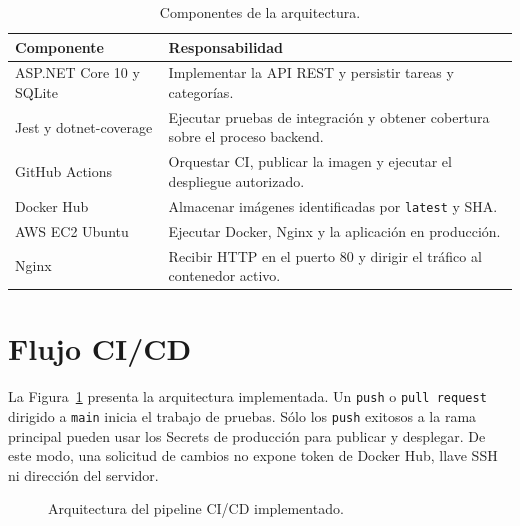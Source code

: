 \documentclass[12pt,a4paper]{report}
\begin{document}
\begin{table}[H]
\centering
\caption{Componentes de la arquitectura.}
\label{tab:components}
\begin{tabularx}{\textwidth}{>{\raggedright\arraybackslash}p{3.2cm}X}
\toprule
\textbf{Componente} & \textbf{Responsabilidad} \\
\midrule
ASP.NET Core 10 y SQLite & Implementar la API REST y persistir tareas y categorías. \\
Jest y dotnet-coverage & Ejecutar pruebas de integración y obtener cobertura sobre el proceso backend. \\
GitHub Actions & Orquestar CI, publicar la imagen y ejecutar el despliegue autorizado. \\
Docker Hub & Almacenar imágenes identificadas por \texttt{latest} y SHA. \\
AWS EC2 Ubuntu & Ejecutar Docker, Nginx y la aplicación en producción. \\
Nginx & Recibir HTTP en el puerto 80 y dirigir el tráfico al contenedor activo. \\
\bottomrule
\end{tabularx}
\end{table}

\section{Flujo CI/CD}

La Figura~\ref{fig:architecture} presenta la arquitectura implementada. Un \texttt{push} o \texttt{pull request} dirigido a \texttt{main} inicia el trabajo de pruebas. Sólo los \texttt{push} exitosos a la rama principal pueden usar los Secrets de producción para publicar y desplegar. De este modo, una solicitud de cambios no expone token de Docker Hub, llave SSH ni dirección del servidor.

\begin{figure}[H]
\centering
{}
\caption{Arquitectura del pipeline CI/CD implementado.}
\label{fig:architecture}
\end{figure}
\end{document}
